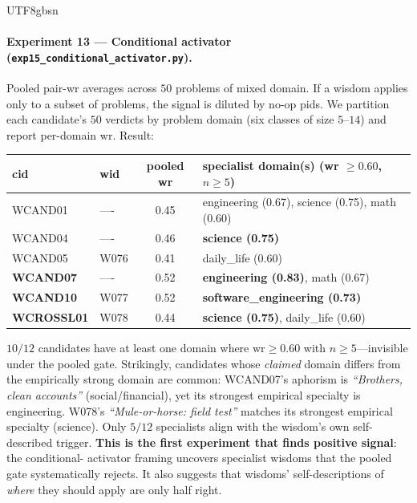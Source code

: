 \documentclass{article}
\begin{document}
\begin{CJK*}{UTF8}{gbsn}
\paragraph{Experiment 13 — Conditional activator
(\texttt{exp15\_conditional\_activator.py}).} Pooled pair-wr
averages across \(50\) problems of mixed domain. If a wisdom
applies only to a subset of problems, the signal is diluted by
no-op pids. We partition each candidate's \(50\) verdicts by
problem domain (six classes of size \(5\text{–}14\)) and report
per-domain wr. Result:

\begin{center}\small
\begin{tabular}{l l c l}
  \toprule
  cid & wid & pooled wr & specialist domain(s) (wr \(\geq 0.60\), \(n \geq 5\)) \\
  \midrule
  WCAND01 & ---- & 0.45 & engineering (0.67), science (0.75), math (0.60) \\
  WCAND04 & ---- & 0.46 & \textbf{science (0.75)} \\
  WCAND05 & W076 & 0.41 & daily\_life (0.60) \\
  \textbf{WCAND07} & ---- & 0.52 & \textbf{engineering (0.83)}, math (0.67) \\
  \textbf{WCAND10} & W077 & 0.52 & \textbf{software\_engineering (0.73)} \\
  \textbf{WCROSSL01} & W078 & 0.44 & \textbf{science (0.75)}, daily\_life (0.60) \\
  \bottomrule
\end{tabular}
\end{center}

\(10/12\) candidates have at least one domain where \(\text{wr}
\geq 0.60\) with \(n \geq 5\)—invisible under the pooled gate.
Strikingly, candidates whose \emph{claimed} domain differs from
the empirically strong domain are common: WCAND07's aphorism is
\emph{``Brothers, clean accounts''} (social/financial), yet its
strongest empirical specialty is engineering. W078's
\emph{``Mule-or-horse: field test''} matches its strongest
empirical specialty (science). Only \(5/12\) specialists align
with the wisdom's own self-described trigger. \textbf{This is the
first experiment that finds positive signal}: the conditional-
activator framing uncovers specialist wisdoms that the pooled
gate systematically rejects. It also suggests that wisdoms'
self-descriptions of \emph{where} they should apply are only
half right.


\end{CJK*}
\end{document}
